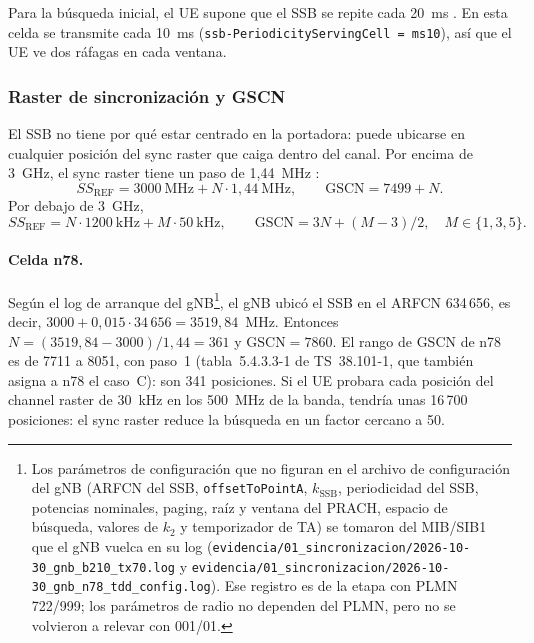 Para la búsqueda inicial, el UE supone que el SSB se repite cada 20~ms \cite[§4.1]{ts38213}. En esta celda se transmite cada 10~ms (\texttt{ssb-PeriodicityServingCell = ms10}), así que el UE ve dos ráfagas en cada ventana.

\subsubsection{Raster de sincronización y GSCN}\label{sec:gscn}
El SSB no tiene por qué estar centrado en la portadora: puede ubicarse en cualquier posición del sync raster que caiga dentro del canal. Por encima de 3~GHz, el sync raster tiene un paso de 1,44~MHz \cite[§5.4.3.1]{ts38101}:
\begin{equation}
SS_\text{REF} = 3000~\text{MHz} + N\cdot 1{,}44~\text{MHz}, \qquad \text{GSCN} = 7499 + N.
\label{eq:gscn}
\end{equation}
Por debajo de 3~GHz,
\begin{equation}
SS_\text{REF} = N\cdot 1200~\text{kHz} + M\cdot 50~\text{kHz}, \qquad \text{GSCN} = 3N + (M-3)/2,\quad M\in\{1,3,5\}.
\label{eq:gscn_bajo}
\end{equation}

\paragraph{Celda n78.} Según el log de arranque del gNB\footnote{Los parámetros de configuración que no figuran en el archivo de configuración del gNB (ARFCN del SSB, \texttt{offsetToPointA}, $k_\text{SSB}$, periodicidad del SSB, potencias nominales, paging, raíz y ventana del PRACH, espacio de búsqueda, valores de $k_2$ y temporizador de TA) se tomaron del MIB/SIB1 que el gNB vuelca en su log (\texttt{evidencia/01\_sincronizacion/2026-10-30\_gnb\_b210\_tx70.log} y \texttt{evidencia/01\_sincronizacion/2026-10-30\_gnb\_n78\_tdd\_config.log}). Ese registro es de la etapa con PLMN 722/999; los parámetros de radio no dependen del PLMN, pero no se volvieron a relevar con 001/01.}, el gNB ubicó el SSB en el ARFCN 634\,656, es decir, $3000 + 0{,}015\cdot 34\,656 = 3519{,}84$~MHz. Entonces $N = (3519{,}84-3000)/1{,}44 = 361$ y $\text{GSCN} = 7860$. El rango de GSCN de n78 es de 7711 a 8051, con paso~1 (tabla~5.4.3.3-1 de TS~38.101-1, que también asigna a n78 el caso~C): son 341 posiciones. Si el UE probara cada posición del channel raster de 30~kHz en los 500~MHz de la banda, tendría unas 16\,700 posiciones: el sync raster reduce la búsqueda en un factor cercano a 50.

